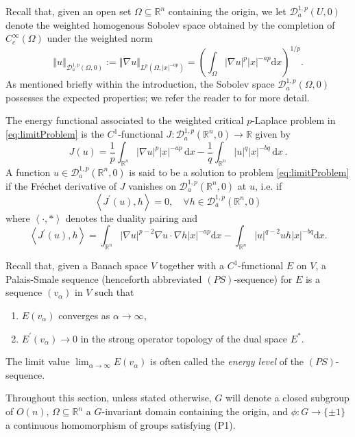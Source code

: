 \documentclass[10pt, reqno]{amsart}
\newcommand{\RR}{\mathbb{R}}
\newcommand{\Om}{\Omega}
\newcommand{\abs}[1]{\left\vert #1 \right\vert}
\newcommand{\norm}[1]{\left\Vert #1 \right\Vert}
\newcommand{\inner}[1]{\left\langle#1\right\rangle}
\newcommand{\D}{\mathcal{D}}
\renewcommand{\d}{\mathrm{d}}
\numberwithin{equation}{section}
\theoremstyle{definition}
\theoremstyle{remark}
\theoremstyle{plain}
\begin{document}
	
	
	Recall that, given an open set $\Om \subseteq \RR^n$ containing the origin, we let $\D_a^{1,p}(U,0)$ denote the weighted homogenous Sobolev space obtained by the completion of $C_c^\infty(\Om)$ under the weighted norm 
	\[
	\norm{u}_{\D_a^{1,p}(\Om,0)} := \norm{\nabla u}_{L^p(\Om, \abs{x}^{-ap})} = \left( \int_{\Om} \abs{\nabla u}^p\abs{x}^{-ap}\mathrm{d}x\right)^{1/p}.	
	\]
	As mentioned briefly within the introduction, the Sobolev space $\D_a^{1,p}(\Om,0)$ possesses the expected properties; we refer the reader to \cite[Chapter 2]{mscChernysh} for more detail. 
	
	The energy functional associated to the weighted critical $p$-Laplace problem in \eqref{eq:limitProblem} is the $C^1$-functional $J : \D_a^{1,p}(\RR^n, 0) \to \mathbb{R}$ given by
	\[
	J(u) = \frac{1}{p}\int_{\RR^n} \abs{\nabla u}^p\abs{x}^{-ap}\,\mathrm{d}x - \frac{1}{q}\int_{\RR^n} \abs{u}^q\abs{x}^{-bq}\,\mathrm{d}x\,.
	\]
	A function $u \in \D_a^{1,p}(\RR^n,0)$ is said to be a solution to problem \eqref{eq:limitProblem} if the Fr\'echet derivative of $J$ vanishes on $\D_a^{1,p}(\RR^n,0)$ at $u$, i.e. if
	\[
	\inner{J^\prime(u), h} = 0, \quad \forall h \in \D_a^{1,p}(\RR^n,0)
	\]
	where $\inner{\cdot, \ast}$ denotes the duality pairing and
	\[
	\inner{J^\prime(u), h} = \int_{\RR^n} \abs{\nabla u}^{p-2} \nabla u \cdot \nabla h \abs{x}^{-ap}\d{x} - \int_{\RR^n} \abs{u}^{q-2}uh\abs{x}^{-bq}\d{x}.
	\]
	
	
	Recall that, given a Banach space $V$ together with a $C^1$-functional $E$ on $V$, a Palais-Smale sequence (henceforth abbreviated $(PS)$-sequence) for $E$ is a sequence $(v_\alpha)$ in $V$ such that 
	\begin{enumerate}
		\item $E(v_\alpha)$ converges as $\alpha \to \infty$,
		\item $E^\prime(v_\alpha) \to 0$ in the strong operator topology of the dual space $E^\ast$.
	\end{enumerate}
	The limit value $\lim_{\alpha \to \infty} E(v_\alpha)$ is often called the \emph{energy level} of the $(PS)$-sequence.
	
	Throughout this section, unless stated otherwise, $G$ will denote a closed subgroup of $O(n)$, $\Om \subseteq \RR^n$ a $G$-invariant domain containing the origin, and $\phi : G \to \{\pm 1\}$ a continuous homomorphism of groups satisfying (P1).		
	
\end{document}
